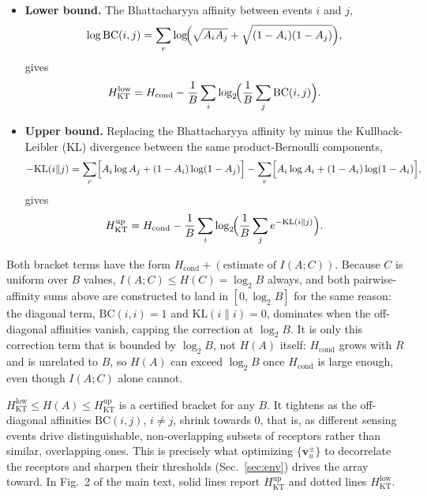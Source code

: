 \documentclass[aps,pre,superscriptaddress,floatfix,longbibliography]{revtex4-2}
\begin{document}
\begin{itemize}
\item \textbf{Lower bound.} The Bhattacharyya affinity between events $i$
and $j$,
\begin{equation}
\log\text{BC}(i,j) = \sum_r \log\!\Bigl(\sqrt{A_iA_j}+\sqrt{(1-A_i)(1-A_j)}\Bigr),
\label{eq:BC}
\end{equation}
gives
\begin{equation}
H_\text{KT}^\text{low} = H_\text{cond} - \frac{1}{B}\sum_i \log_2\!\Bigl(\frac{1}{B}\sum_j \text{BC}(i,j)\Bigr).
\label{eq:KTlow}
\end{equation}
\item \textbf{Upper bound.} Replacing the Bhattacharyya affinity by minus
the Kullback-Leibler (KL) divergence between the same product-Bernoulli
components,
\begin{equation}
-\text{KL}(i\|j) = \sum_r \Bigl[A_i\log A_j + (1-A_i)\log(1-A_j)\Bigr] - \sum_r\Bigl[A_i\log A_i+(1-A_i)\log(1-A_i)\Bigr],
\label{eq:KL}
\end{equation}
gives
\begin{equation}
H_\text{KT}^\text{up} = H_\text{cond} - \frac{1}{B}\sum_i \log_2\!\Bigl(\frac{1}{B}\sum_j e^{-\text{KL}(i\|j)}\Bigr).
\label{eq:KTup}
\end{equation}
\end{itemize}

Both bracket terms have the form $H_\text{cond}+(\text{estimate of }I(A;C))$.
Because $C$ is uniform over $B$ values, $I(A;C)\le H(C)=\log_2 B$ always,
and both pairwise-affinity sums above are constructed to land in
$[0,\log_2 B]$ for the same reason: the diagonal term, $\text{BC}(i,i)=1$
and $\text{KL}(i\|i)=0$, dominates when the off-diagonal affinities vanish,
capping the correction at $\log_2 B$. It is only this correction term that
is bounded by $\log_2 B$, not $H(A)$ itself: $H_\text{cond}$ grows with $R$
and is unrelated to $B$, so $H(A)$ can exceed $\log_2 B$ once $H_\text{cond}$
is large enough, even though $I(A;C)$ alone cannot.

$H_\text{KT}^\text{low} \le H(A) \le H_\text{KT}^\text{up}$ is a certified
bracket for any $B$. It tightens as the off-diagonal affinities
$\text{BC}(i,j)$, $i\ne j$, shrink towards $0$, that is, as different
sensing events drive distinguishable, non-overlapping subsets of receptors
rather than similar, overlapping ones. This is precisely what optimizing
$\{\mathbf v_u^\pm\}$ to decorrelate the receptors and sharpen their
thresholds (Sec.~\ref{sec:env}) drives the array toward. In Fig.~2 of the
main text, solid lines report $H_\text{KT}^\text{up}$ and dotted lines
$H_\text{KT}^\text{low}$.



\end{document}
